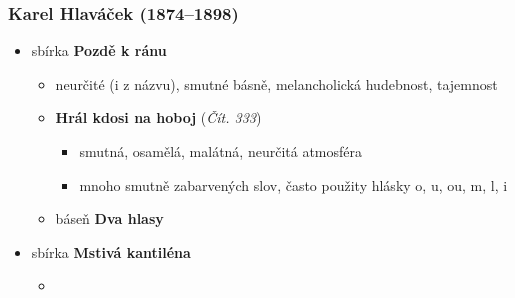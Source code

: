 \subsubsection{Karel Hlaváček (1874--1898)}
\begin{itemize}

\item sbírka \textbf{Pozdě k ránu}
	\begin{itemize}
	\item neurčité (i z názvu), smutné básně, melancholická hudebnost, tajemnost
	\item \textbf{Hrál kdosi na hoboj} (\textit{Čít. 333})
		\begin{itemize}
		\item smutná, osamělá, malátná, neurčitá atmosféra
		\item mnoho smutně zabarvených slov, často použity hlásky o, u, ou, m, l, i
		\end{itemize}
	\item báseň \textbf{Dva hlasy}
	\end{itemize}
\item sbírka \textbf{Mstivá kantiléna}
	\begin{itemize}
	\item 
	\end{itemize}
\end{itemize}

